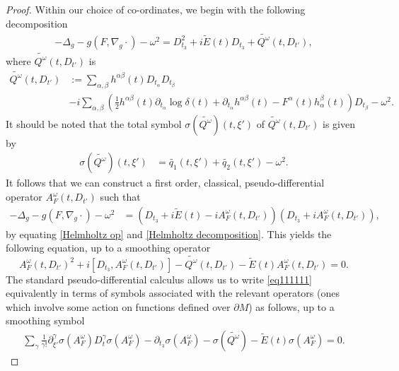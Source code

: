 \documentclass[12pt,a4paper]{amsart}
\numberwithin{equation}{section}
\theoremstyle{plain}
\theoremstyle{definition}
\begin{document}
\begin{proof}
		Within our choice of co-ordinates, we begin with the following decomposition
		\begin{align}
			-\Delta_g - g(F,\nabla_g\cdot)-\omega^2 = D_{t_3}^2 + i \widetilde{E}(t) D_{t_3} + \widetilde{Q^\omega}(t,D_{t'}), \label{Helmholtz op}
		\end{align}
		where $\widetilde{Q^\omega}(t,D_{t'})$ is 
		\begin{align*}
			\widetilde{Q^\omega}(t,D_{t'}) &:= \sum_{\alpha,\beta}h^{\alpha\beta}(t)D_{t_\alpha}D_{t_\beta} \\ 
			&-i\sum_{\alpha,\beta}\left(\frac{1}{2}h^{\alpha\beta}(t)\partial_{t_\alpha}\log\delta(t)+\partial_{t_\alpha}h^{\alpha\beta}(t)-F^\alpha(t)h^\beta_\alpha(t)\right)D_{t_\beta} -\omega^2.
		\end{align*}
		It should be noted that the total symbol $\sigma(\widetilde{Q^\omega})(t,\xi')$ of $\widetilde{Q^\omega}(t,D_{t'})$ is given by 
		\begin{align*}
			\sigma(\widetilde{Q^\omega})(t,\xi') &= \widetilde{q_1}(t,\xi') + \widetilde{q_2}(t,\xi')-\omega^2.
		\end{align*}
		It follows that we can construct a first order, classical, pseudo-differential operator $A^\omega_F(t,D_{t'})$ such that 
		\begin{align}
			-\Delta_g - g(F,\nabla_g\cdot)-\omega^2  &= (D_{t_3}+i\widetilde{E}(t)-iA^\omega_F(t,D_{t'}))(D_{t_3}+iA^\omega_F(t,D_{t'})),\label{Helmholtz decomposition}
		\end{align}
       by equating \eqref{Helmholtz op} and \eqref{Helmholtz decomposition}. This yields the following equation, up to a smoothing operator
		\begin{equation}\label{eq111111}
			A^\omega_F(t,D_{t'})^2 +i[D_{t_3},A^\omega_F(t,D_{t'})] - \widetilde{Q^\omega}(t,D_{t'}) - \widetilde{E}(t)A^\omega_F(t,D_{t'})  = 0.
		\end{equation}
		The standard pseudo-differential calculus allows us to write \eqref{eq111111} equivalently in terms of symbols associated with the relevant operators (ones which involve some action on functions defined over $\partial M$) as follows, up to a smoothing symbol  
		\begin{align*}
			\sum_{\gamma} \frac{1}{\gamma!} \partial_{\xi'}^\gamma \sigma(A^\omega_F) D_t^\gamma\sigma(A^\omega_F)-\partial_{t_3} \sigma(A^\omega_F) - \sigma(\widetilde{Q^\omega}) - \widetilde{E}(t) \sigma(A^\omega_F) = 0.
		\end{align*}

\end{proof}
\end{document}
